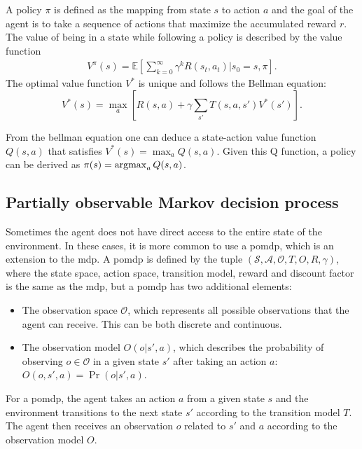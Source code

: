A policy $\pi$ is defined as the mapping from state $s$ to action $a$ and the goal of the agent is to take a sequence of actions that maximize the accumulated reward $r$. The value of being in a state while following a policy is described by the value function
\begin{align}
    V^\pi(s) = \mathbb{E} \left[ \sum_{k=0}^\infty \gamma^k R(s_t, a_t) | s_0 = s, \pi \right].
\end{align}
The optimal value function $V^*$ is unique and follows the Bellman equation: 
\begin{equation}
    V^*(s)= \max_{a} \left[ R(s, a) + \gamma \sum_{s'} T(s,a,s') V^*(s') \right].
    \label{eq:bellman}
\end{equation}

From the bellman equation one can deduce a state-action value function $Q(s,a)$ that satisfies $V^*(s)=\max_a Q(s,a)$. Given this Q function, a policy can be derived as $\pi(s) = \operatorname*{argmax}_a Q(s,a)$. 

\subsection{Partially observable Markov decision process}\label{sec:background_pomdp}
Sometimes the agent does not have direct access to the entire state of the environment. In these cases, it is more common to use a \gls{pomdp}, which is an extension to the \gls{mdp}. A \gls{pomdp} is defined by the tuple $(\mathcal{S},\mathcal{A},\mathcal{O},T,O,R,\gamma)$, where the state space, action space, transition model, reward and discount factor is the same as the \gls{mdp}, but a \gls{pomdp} has two additional elements: 
\begin{itemize}
    \item The observation space $\mathcal{O}$, which represents all possible observations that the agent can receive. This can be both discrete and continuous.
    \item The observation model $O(o|s',a)$, which describes the probability of observing $o \in \mathcal{O}$ in a given state $s'$ after taking an action $a$: $O(o,s',a)=\Pr(o|s',a)$.
\end{itemize}

For a \gls{pomdp}, the agent takes an action $a$ from a given state $s$ and the environment transitions to the next state $s'$ according to the transition model $T$. The agent then receives an observation $o$ related to $s'$ and $a$ according to the observation model $O$. 

